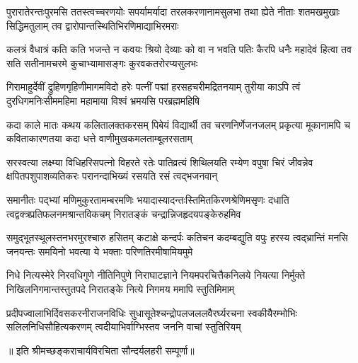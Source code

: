 \fourlineindentedshloka
{पुरारातेरन्तःपुरमसि ततस्त्वच्चरणयोः}
{सपर्यामर्यादा तरलकरणानामसुलभा}
{तथा ह्येते नीताः शतमखमुखाः सिद्धिमतुलाम्}
{तव द्वारोपान्तस्थितिभिरणिमाद्याभिरमराः}%

\fourlineindentedshloka
{कलत्रं वैधात्रं कति कति भजन्ते न कवयः}
{श्रियो देव्याः को वा न भवति पतिः कैरपि धनैः}
{महादेवं हित्वा तव सति सतीनामचरमे}
{कुचाभ्यामासङ्गः कुरवकतरोरप्यसुलभः}%

\fourlineindentedshloka
{गिरामाहुर्देवीं द्रुहिणगृहिणीमागमविदो}
{हरेः पत्नीं पद्मां हरसहचरीमद्रितनयाम्}
{तुरीया काऽपि त्वं दुरधिगमनिःसीममहिमा}
{महामाया विश्वं भ्रमयसि परब्रह्ममहिषि}%

\fourlineindentedshloka
{कदा काले मातः कथय कलितालक्तकरसम्}
{पिबेयं विद्यार्थी तव चरणनिर्णेजनजलम्}
{प्रकृत्या मूकानामपि च कविताकारणतया}
{कदा धत्ते वाणीमुखकमलताम्बूलरसताम्}%

\fourlineindentedshloka
{सरस्वत्या लक्ष्म्या विधिहरिसपत्नो विहरते}
{रतेः पातिव्रत्यं शिथिलयति रम्येण वपुषा}
{चिरं जीवन्नेव क्षपितपशुपाशव्यतिकरः}
{परानन्दाभिख्यं रसयति रसं त्वद्भजनवान्}%

\fourlineindentedshloka
{समानीतः पद्‌भ्यां मणिमुकुरतामम्बरमणिः}
{भयादास्यादन्तःस्तिमितकिरणश्रेणिमसृणः}
{दधाति त्वद्वक्त्रप्रतिफलनमश्रान्तविकचम्}
{निरातङ्कं चन्द्रान्निजहृदयपङ्केरुहमिव}%

\fourlineindentedshloka
{समुद्भूतस्थूलस्तनभरमुरश्चारु हसितम्}
{कटाक्षे कन्दर्पः कतिचन कदम्बद्युति वपुः}
{हरस्य त्वद्भ्रान्तिं मनसि जनयन्तः समयिनो}
{भवत्या ये भक्ताः परिणतिरमीषामियमुमे}%

\fourlineindentedshloka
{निधे नित्यस्मेरे निरवधिगुणे नीतिनिपुणे}
{निराघाटज्ञाने नियमपरचित्तैकनिलये}
{नियत्या निर्मुक्ते निखिलनिगमान्तस्तुतपदे}
{निरातङ्के नित्ये निगमय ममापि स्तुतिमिमाम्}%

\fourlineindentedshloka
{प्रदीपज्वालाभिर्दिवसकरनीराजनविधिः}
{सुधासूतेश्चन्द्रोपलजललवैरर्घ्यरचना}
{स्वकीयैरम्भोभिः सलिलनिधिसौहित्यकरणम्}
{त्वदीयाभिर्वाग्भिस्तव जननि वाचां स्तुतिरियम्}%

{॥ इति श्रीमच्छङ्कराचार्यविरचिता सौन्दर्यलहरी सम्पूर्णा॥}